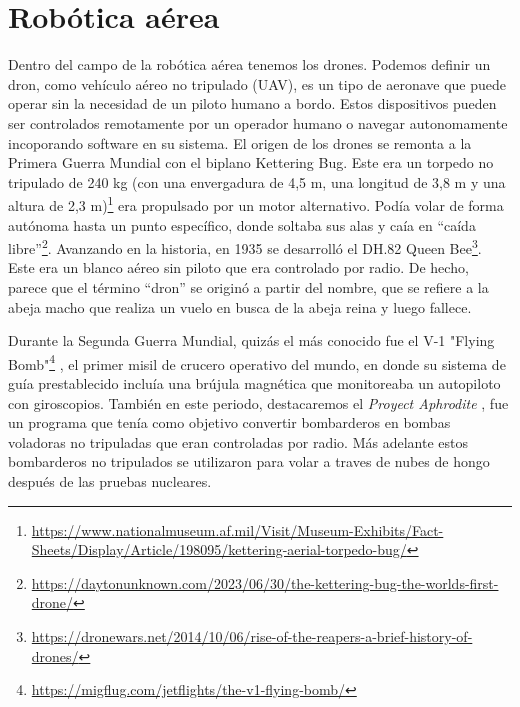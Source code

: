 \section{Robótica aérea}
\label{sec:subseccion}

Dentro del campo de la robótica aérea tenemos los drones. Podemos definir un dron, como vehículo aéreo no tripulado (UAV), es un tipo de aeronave que puede operar sin la 
necesidad de un piloto humano a bordo. Estos dispositivos pueden ser controlados remotamente por un operador humano o navegar autonomamente incoporando software 
en su sistema. 
El origen de los drones se remonta a la Primera Guerra Mundial con el biplano Kettering Bug.
Este era un torpedo no tripulado de 240 kg (con una envergadura de 4,5 m, una longitud de
3,8 m y una altura de 2,3 m)\footnote{\url{https://www.nationalmuseum.af.mil/Visit/Museum-Exhibits/Fact-Sheets/Display/Article/198095/kettering-aerial-torpedo-bug/}} era propulsado por un motor alternativo. Podía volar de
forma autónoma hasta un punto específico, donde soltaba sus alas y caía en “caída libre”\footnote{\url{https://daytonunknown.com/2023/06/30/the-kettering-bug-the-worlds-first-drone/}}.
Avanzando en la historia, en 1935 se desarrolló el DH.82 Queen Bee\footnote{\url{https://dronewars.net/2014/10/06/rise-of-the-reapers-a-brief-history-of-drones/}}. Este era un blanco aéreo sin piloto que era controlado por radio. De hecho, parece que el término “dron” se originó a partir del nombre, que se refiere a la abeja macho que realiza un vuelo en busca de la abeja reina y luego fallece. \newline

Durante la Segunda Guerra Mundial, quizás el más conocido fue el V-1 "Flying Bomb"\footnote{\url{https://migflug.com/jetflights/the-v1-flying-bomb/}} , el primer misil
de crucero operativo del mundo, en donde su sistema de guía prestablecido incluía una brújula magnética que monitoreaba un autopiloto con giroscopios. También en este periodo, destacaremos el \textit{Proyect Aphrodite} \cite{Aphrodite}, fue un programa que tenía como objetivo convertir bombarderos en bombas voladoras no tripuladas que eran controladas por radio. Más adelante estos bombarderos no tripulados se utilizaron para volar a traves de nubes de hongo
después de las pruebas nucleares. \newline

